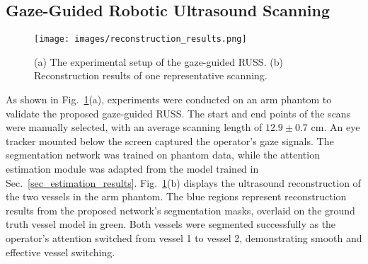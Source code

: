 \subsection{Gaze-Guided Robotic Ultrasound Scanning}

\begin{figure}[ht!]
\centering
\texttt{[image: images/reconstruction\_results.png]}
\caption{(a) The experimental setup of the gaze-guided RUSS. (b) Reconstruction results of one representative scanning.
}
\label{Fig_exp_setup}
\end{figure}
As shown in Fig.~\ref{Fig_exp_setup}(a), experiments were conducted on an arm phantom to validate the proposed gaze-guided RUSS. The start and end points of the scans were manually selected, with an average scanning length of $12.9 \pm 0.7$ cm. An eye tracker mounted below the screen captured the operator's gaze signals. The segmentation network was trained on phantom data, while the attention estimation module was adapted from the model trained in Sec.~\ref{sec_estimation_results}.
Fig.~\ref{Fig_exp_setup}(b) displays the ultrasound reconstruction of the two vessels in the arm phantom. The blue regions represent reconstruction results from the proposed network’s segmentation masks, overlaid on the ground truth vessel model in green. Both vessels were segmented successfully as the operator’s attention switched from vessel 1 to vessel 2, demonstrating smooth and effective vessel switching.
\begin{table}[ht!]
\caption{Performances w/ and w/o confidence-based orientation correction (Averaged $d_c$).}\label{tab:confidence_control}\centering
  \renewcommand{\arraystretch}{0.6}
\end{table}

